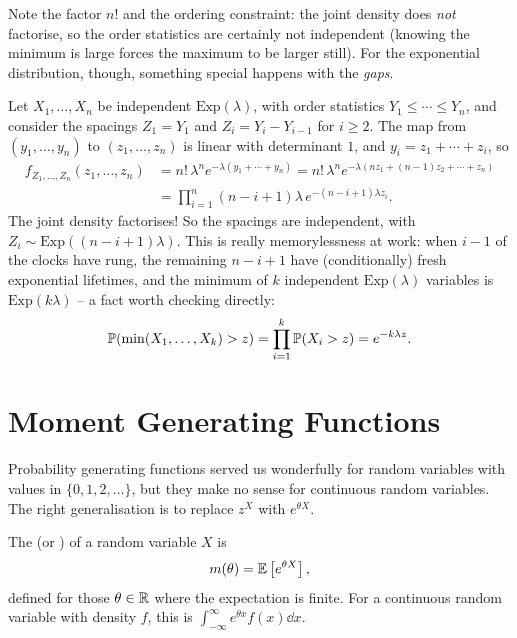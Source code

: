 \documentclass[a4paper]{scrartcl}
\begin{document}
Note the factor $n!$ and the ordering constraint: the joint density does \emph{not} factorise, so the order statistics are certainly not independent (knowing the minimum is large forces the maximum to be larger still). For the exponential distribution, though, something special happens with the \emph{gaps}.

\begin{example}
	Let $X_1, \dots, X_n$ be independent $\mathrm{Exp}(\lambda)$, with order statistics $Y_1 \leq \cdots \leq Y_n$, and consider the spacings $Z_1 = Y_1$ and $Z_i = Y_i - Y_{i - 1}$ for $i \geq 2$. The map from $(y_1, \dots, y_n)$ to $(z_1, \dots, z_n)$ is linear with determinant $1$, and $y_i = z_1 + \cdots + z_i$, so
	\begin{align*}
		f_{Z_1, \dots, Z_n}(z_1, \dots, z_n) &= n!\, \lambda^n e^{-\lambda(y_1 + \cdots + y_n)} = n!\,\lambda^n e^{-\lambda(nz_1 + (n-1)z_2 + \cdots + z_n)} \\
		&= \prod_{i = 1}^{n} (n - i + 1)\lambda \, e^{-(n - i + 1)\lambda z_i}.
	\end{align*}
	The joint density factorises! So the spacings are independent, with $Z_i \sim \mathrm{Exp}((n - i + 1)\lambda)$. This is really memorylessness at work: when $i - 1$ of the clocks have rung, the remaining $n - i + 1$ have (conditionally) fresh exponential lifetimes, and the minimum of $k$ independent $\mathrm{Exp}(\lambda)$ variables is $\mathrm{Exp}(k\lambda)$ -- a fact worth checking directly:
	$$
	\mathbb{P}(\min(X_1, \dots, X_k) > z) = \prod_{i=1}^k \mathbb{P}(X_i > z) = e^{-k\lambda z}.
	$$
\end{example}


\section{Moment Generating Functions}

Probability generating functions served us wonderfully for random variables with values in $\{0, 1, 2, \dots\}$, but they make no sense for continuous random variables. The right generalisation is to replace $z^X$ with $e^{\theta X}$.

\begin{definition}
	The  (or ) of a random variable $X$ is
	$$
	m(\theta) = \mathbb{E}\left[e^{\theta X}\right],
	$$
	defined for those $\theta \in \mathbb{R}$ where the expectation is finite. For a continuous random variable with density $f$, this is $\int_{-\infty}^{\infty} e^{\theta x}f(x)\dd x$.
\end{definition}
\end{document}
